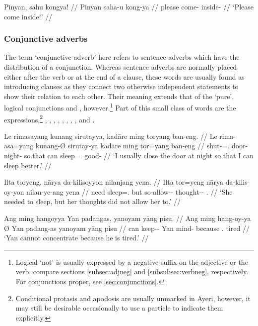 \ex
\begingl
	\gla Pinyan, sahu kongya! //
	\glb Pinyan saha-u kong-ya //
	\glc please come-\Imp{} inside-\Loc{} //
	\glft `Please come inside!' //
\endgl
\xe

\subsubsection{Conjunctive adverbs}
\label{subsubsec:conjadv}

The term `conjunctive adverb' here refers to sentence adverbs which have the
distribution of a conjunction. Whereas sentence adverbs are normally placed
either after the verb or at the end of a clause, these words are usually found
as introducing clauses as they connect two otherwise independent statements to
show their relation to each other. Their meaning extends that of the `pure',
logical conjunctions  and ,
however.\footnote{Logical `not' is usually expressed by a negative suffix on
the adjective or the verb, compare sections \ref{subsec:adjneg} and
\ref{subsubsec:verbneg}, respectively. For conjunctions proper, see 
\autoref{sec:conjunctions}.} Part of this small class of words are the 
expressions,\footnote{Conditional protasis and 
apodosis are usually unmarked in Ayeri, however, it may still be desirable 
occasionally to use a particle to indicate them explicitly.}
,
,
,
,
,
,
,
, and 
.

\pex
\a\begingl
	\gla Le rimasayang kunang sirutayya, kadāre ming toryang ban-eng. //
	\glb Le rima-asa=yang kunang-Ø sirutay-ya kadāre ming tor=yang 
		ban-eng //
	\glc \PatTI{} shut-\Hab{}=\Fsg{}.\Aarg{} door-\Top{} night-\Loc{} 
		so.that can sleep=\Fsg{}.\Aarg{} good-\Comp{} //
	\glft `I usually close the door at night so that I can sleep better.' //
\endgl

\a\label{ex:but}\begingl
	\gla Ilta toryeng, nārya da-kilisoyyon nilanjang yena. //
	\glb Ilta tor=yeng nārya da-kilis-oy-yon nilan-ye-ang yena //
	\glc need sleep=\TsgF{}.\Aarg{} but so-allow-\Neg{}-\TplN{} 
		thought-\Pl{}-\Aarg{} \TsgF{}.\Gen{} //
	\glft `She needed to sleep, but her thoughts did not allow her to.' //
\endgl

\a\begingl
	\gla Ang ming hangoyya {} Yan padangas, yanoyam yāng pisu. //
	\glb Ang ming hang-oy-ya Ø Yan padang-as yanoyam yāng pisu //
	\glc \AgtT{} can keep-\Neg{}-\TsgM{} \Top{} Yan mind-\Parg{} because 
		\TsgM{}.\Aarg{} tired //
	\glft `Yan cannot concentrate because he is tired.' //
\endgl

